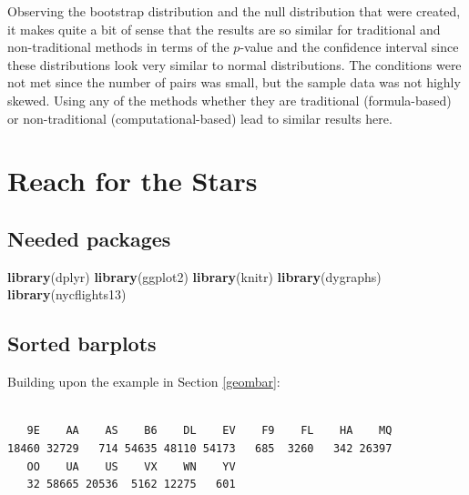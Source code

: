 \documentclass[12pt,]{krantz}
\makeatletter
\newenvironment{Shaded}{\begin{snugshade}}{\end{snugshade}}
\newcommand{\KeywordTok}[1]{\textcolor[rgb]{0.27,0.27,0.27}{\textbf{#1}}}
\newcommand{\StringTok}[1]{\textcolor[rgb]{0.5,0.5,0.5}{#1}}
\newcommand{\OperatorTok}[1]{\textcolor[rgb]{0.43,0.43,0.43}{\textbf{#1}}}
\newcommand{\NormalTok}[1]{#1}
\newenvironment{kframe}{%
\medskip{}
\setlength{\fboxsep}{.8em}
 \def\at@end@of@kframe{}%
 \ifinner\ifhmode%
  \def\at@end@of@kframe{\end{minipage}}%
  \begin{minipage}{\columnwidth}%
 \fi\fi%
 \def\FrameCommand##1{\hskip\@totalleftmargin \hskip-\fboxsep
 \colorbox{shadecolor}{##1}\hskip-\fboxsep
     \hskip-\linewidth \hskip-\@totalleftmargin \hskip\columnwidth}%
 \MakeFramed {\advance\hsize-\width
   \@totalleftmargin\z@ \linewidth\hsize
   \@setminipage}}%
 {\par\unskip\endMakeFramed%
 \at@end@of@kframe}
\renewenvironment{Shaded}{\begin{kframe}}{\end{kframe}}
\makeatother
\begin{document}
Observing the bootstrap distribution and the null distribution that were
created, it makes quite a bit of sense that the results are so similar
for traditional and non-traditional methods in terms of the \(p\)-value
and the confidence interval since these distributions look very similar
to normal distributions. The conditions were not met since the number of
pairs was small, but the sample data was not highly skewed. Using any of
the methods whether they are traditional (formula-based) or
non-traditional (computational-based) lead to similar results here.

\chapter{Reach for the Stars}\label{appendixC}

\section*{Needed packages}\label{needed-packages-11}


\begin{Shaded}
\begin{Highlighting}[]
\KeywordTok{library}\NormalTok{(dplyr)}
\KeywordTok{library}\NormalTok{(ggplot2)}
\KeywordTok{library}\NormalTok{(knitr)}
\KeywordTok{library}\NormalTok{(dygraphs)}
\KeywordTok{library}\NormalTok{(nycflights13)}
\end{Highlighting}
\end{Shaded}

\section{Sorted barplots}\label{sorted-barplots}

Building upon the example in Section \ref{geombar}:

\begin{Shaded}
\end{Shaded}

\begin{verbatim}

   9E    AA    AS    B6    DL    EV    F9    FL    HA    MQ 
18460 32729   714 54635 48110 54173   685  3260   342 26397 
   OO    UA    US    VX    WN    YV 
   32 58665 20536  5162 12275   601 
\end{verbatim}
\end{document}
